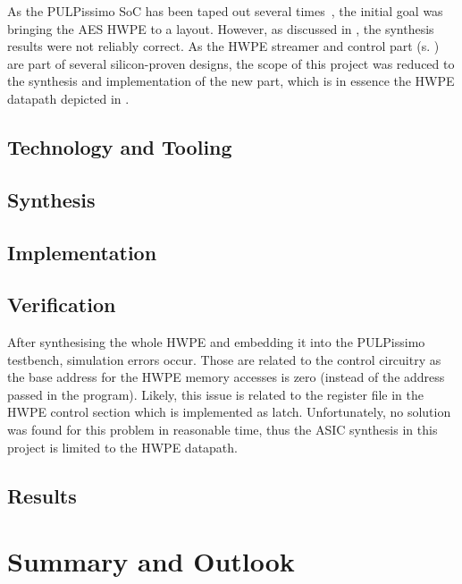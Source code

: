 \documentclass[a4paper, 12pt]{article}
\begin{document}
As the PULPissimo SoC has been taped out several times~\cite{pulp-chips}, the initial goal was bringing the AES HWPE to a layout. However, as discussed in , the synthesis results were not reliably correct. As the HWPE streamer and control part (s. ) are part of several silicon-proven designs, the scope of this project was reduced to the synthesis and implementation of the new part, which is in essence the HWPE datapath depicted in .


\subsection{Technology and Tooling} \label{sec:asic:tools}

\subsection{Synthesis} \label{sec:asic:synthesis}

\subsection{Implementation} \label{sec:asic:synthesis}

\subsection{Verification} \label{sec:asic:verification}

After synthesising the whole HWPE and embedding it into the PULPissimo testbench, simulation errors occur. Those are related to the control circuitry as the base address for the HWPE memory accesses is zero (instead of the address passed in the program). Likely, this issue is related to the register file in the HWPE control section which is implemented as latch. Unfortunately, no solution was found for this problem in reasonable time, thus the ASIC synthesis in this project is limited to the HWPE datapath.

\subsection{Results} \label{sec:asic:results}


\section{Summary and Outlook} \label{sec:summary}


\clearpage
\sloppy
\printbibliography
\end{document}
